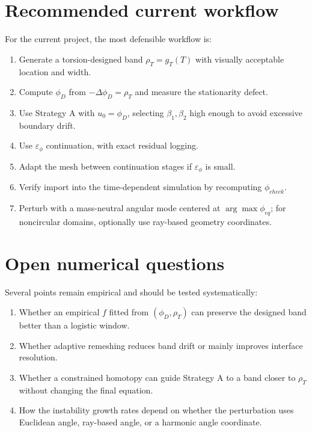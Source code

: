 \documentclass[11pt,a4paper]{article}
\newcommand{\eps}{\varepsilon}
\begin{document}
\section{Recommended current workflow}

For the current project, the most defensible workflow is:
\begin{enumerate}[leftmargin=2em]
  \item Generate a torsion-designed band $\rho_T=g_T(T)$ with visually acceptable location and width.
  \item Compute $\phi_D$ from $-\Delta\phi_D=\rho_T$ and measure the stationarity defect.
  \item Use Strategy A with $u_0=\phi_D$, selecting $\beta_1,\beta_2$ high enough to avoid excessive boundary drift.
  \item Use $\eps_\phi$ continuation, with exact residual logging.
  \item Adapt the mesh between continuation stages if $\eps_\phi$ is small.
  \item Verify import into the time-dependent simulation by recomputing $\phi_{check}$.
  \item Perturb with a mass-neutral angular mode centered at $\arg\max\phi_{eq}$; for noncircular domains, optionally use ray-based geometry coordinates.
\end{enumerate}

\section{Open numerical questions}

Several points remain empirical and should be tested systematically:
\begin{enumerate}[leftmargin=2em]
  \item Whether an empirical $f$ fitted from $(\phi_D,\rho_T)$ can preserve the designed band better than a logistic window.
  \item Whether adaptive remeshing reduces band drift or mainly improves interface resolution.
  \item Whether a constrained homotopy can guide Strategy A to a band closer to $\rho_T$ without changing the final equation.
  \item How the instability growth rates depend on whether the perturbation uses Euclidean angle, ray-based angle, or a harmonic angle coordinate.
\end{enumerate}

\appendix
\end{document}
